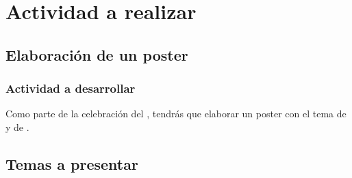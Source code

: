 \documentclass[14pt]{beamer}
\begin{document}
\section{Actividad a realizar}
\subsection{Elaboración de un poster}

\begin{frame}
\frametitle{Actividad a desarrollar}
Como parte de la celebración del , \pause tendrás que elaborar un poster con el tema de  y de .
\end{frame}

\subsection{Temas a presentar}
\end{document}
